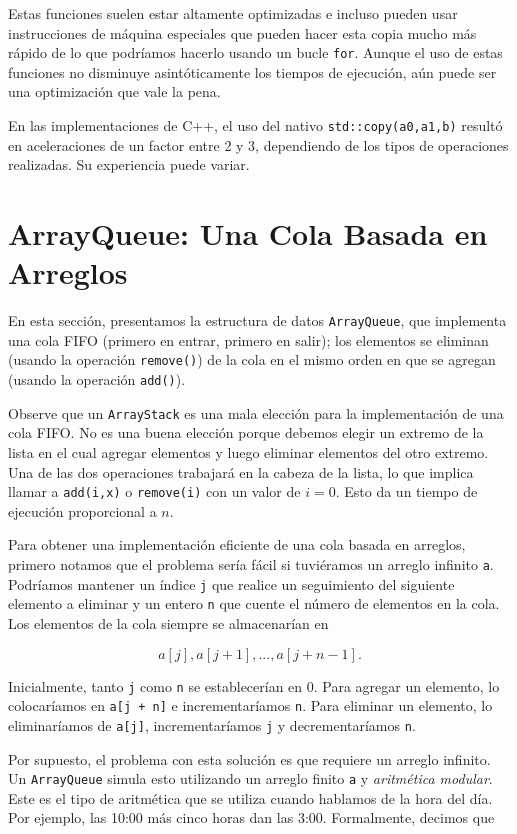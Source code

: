 \documentclass[11pt]{book}
\theoremstyle{plain}
\begin{document}
Estas funciones suelen estar altamente optimizadas e incluso pueden usar instrucciones de máquina especiales que pueden hacer esta copia mucho más rápido de lo que podríamos hacerlo usando un bucle \texttt{for}. Aunque el uso de estas funciones no disminuye asintóticamente los tiempos de ejecución, aún puede ser una optimización que vale la pena.

En las implementaciones de C++, el uso del nativo \texttt{std::copy(a0,a1,b)} resultó en aceleraciones de un factor entre 2 y 3, dependiendo de los tipos de operaciones realizadas. Su experiencia puede variar.

\section{ArrayQueue: Una Cola Basada en Arreglos}

En esta sección, presentamos la estructura de datos \texttt{ArrayQueue}, que implementa una cola FIFO (primero en entrar, primero en salir); los elementos se eliminan (usando la operación \texttt{remove()}) de la cola en el mismo orden en que se agregan (usando la operación \texttt{add()}).

Observe que un \texttt{ArrayStack} es una mala elección para la implementación de una cola FIFO. No es una buena elección porque debemos elegir un extremo de la lista en el cual agregar elementos y luego eliminar elementos del otro extremo. Una de las dos operaciones trabajará en la cabeza de la lista, lo que implica llamar a \texttt{add(i,x)} o \texttt{remove(i)} con un valor de $i = 0$. Esto da un tiempo de ejecución proporcional a $n$.

Para obtener una implementación eficiente de una cola basada en arreglos, primero notamos que el problema sería fácil si tuviéramos un arreglo infinito \texttt{a}. Podríamos mantener un índice \texttt{j} que realice un seguimiento del siguiente elemento a eliminar y un entero \texttt{n} que cuente el número de elementos en la cola. Los elementos de la cola siempre se almacenarían en

$$
a[j], a[j+1], ..., a[j+n-1] .
$$

Inicialmente, tanto \texttt{j} como \texttt{n} se establecerían en 0. Para agregar un elemento, lo colocaríamos en \texttt{a[j + n]} e incrementaríamos \texttt{n}. Para eliminar un elemento, lo eliminaríamos de \texttt{a[j]}, incrementaríamos \texttt{j} y decrementaríamos \texttt{n}.

Por supuesto, el problema con esta solución es que requiere un arreglo infinito. Un \texttt{ArrayQueue} simula esto utilizando un arreglo finito \texttt{a} y \emph{aritmética modular}. Este es el tipo de aritmética que se utiliza cuando hablamos de la hora del día. Por ejemplo, las 10:00 más cinco horas dan las 3:00. Formalmente, decimos que
\end{document}
